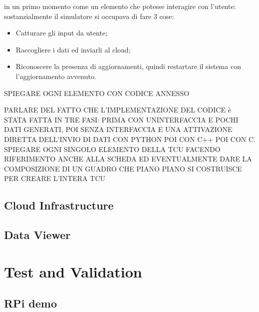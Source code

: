 in un primo momento come un elemento che potesse interagire con l'utente: sostanzialmente il simulatore si occupava di fare 3 cose:
\begin{itemize}
    \item Catturare gli input da utente;
    \item Raccogliere i dati ed inviarli al cloud;
    \item Riconoscere la presenza di aggiornamenti, quindi restartare il sistema con l'aggiornamento avvenuto.
\end{itemize}
SPIEGARE OGNI ELEMENTO CON CODICE ANNESSO

PARLARE DEL FATTO CHE L'IMPLEMENTAZIONE DEL CODICE è STATA FATTA IN TRE FASI: PRIMA CON UNINTERFACCIA E POCHI DATI GENERATI, POI SENZA INTERFACCIA E UNA ATTIVAZIONE DIRETTA DELL'INVIO DI DATI CON PYTHON POI CON C++ POI CON C. SPIEGARE OGNI SINGOLO ELEMENTO DELLA TCU FACENDO RIFERIMENTO ANCHE ALLA SCHEDA ED EVENTUALMENTE DARE LA COMPOSIZIONE DI UN GUADRO CHE PIANO PIANO SI COSTRUISCE PER CREARE L'INTERA TCU
\subsection{Cloud Infrastructure}
\subsection{Data Viewer}

\section{Test and Validation}
\subsection{RPi demo}